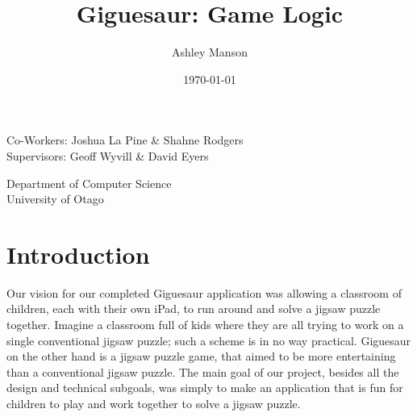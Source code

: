 \documentclass{article}
\begin{document}
\title{Giguesaur: Game Logic}
\author{Ashley Manson}
\date{\today}

\begin{titlepage}

\maketitle

\begin{center}
\large 
Co-Workers: Joshua La Pine \& Shahne Rodgers\\
Supervisors: Geoff Wyvill \& David Eyers\\

\vspace*{1\baselineskip} %

Department of Computer Science\\
University of Otago

\end{center}

\end{titlepage}


\tableofcontents
\newpage


\section{Introduction}

Our vision for our completed Giguesaur application was allowing a classroom of
children, each with their own iPad, to run around and solve a jigsaw puzzle
together. Imagine a classroom full of kids where they are all trying to work on
a single conventional jigsaw puzzle; such a scheme is in no way
practical. Giguesaur on the other hand is a jigsaw puzzle game, that aimed to be
more entertaining than a conventional jigsaw puzzle. The main goal of our
project, besides all the design and technical subgoals, was simply to make an
application that is fun for children to play and work together to solve a jigsaw
puzzle.

\end{document}
